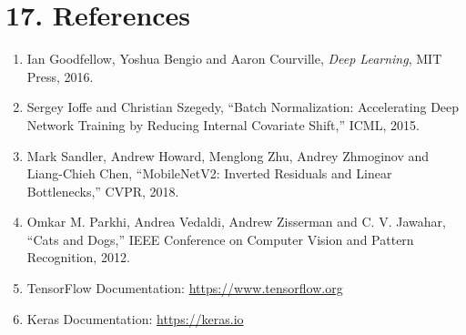 \documentclass[10pt]{article}
\begin{document}
\section*{17. References}

\begin{enumerate}
\item Ian Goodfellow, Yoshua Bengio and Aaron Courville,
\emph{Deep Learning}, MIT Press, 2016.

\item Sergey Ioffe and Christian Szegedy,
``Batch Normalization: Accelerating Deep Network Training by Reducing
Internal Covariate Shift,'' ICML, 2015.

\item Mark Sandler, Andrew Howard, Menglong Zhu, Andrey Zhmoginov and
Liang-Chieh Chen, ``MobileNetV2: Inverted Residuals and Linear
Bottlenecks,'' CVPR, 2018.

\item Omkar M. Parkhi, Andrea Vedaldi, Andrew Zisserman and C. V. Jawahar,
``Cats and Dogs,'' IEEE Conference on Computer Vision and Pattern
Recognition, 2012.

\item TensorFlow Documentation:
\url{https://www.tensorflow.org}

\item Keras Documentation:
\url{https://keras.io}
\end{enumerate}
\end{document}
